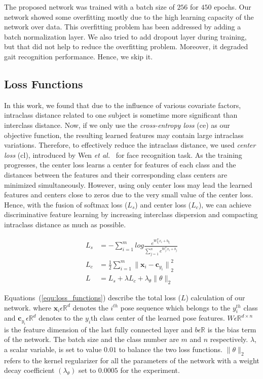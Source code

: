 The proposed network was trained with a batch size of $ 256 $ for $ 450 $ epochs. Our network showed some overfitting mostly due to the high learning capacity of the network over data. This overfitting problem has been addressed by adding a batch normalization layer. We also tried to add dropout layer during training, but that did not help to reduce the overfitting problem. Moreover, it degraded gait recognition performance. Hence, we skip it.


\subsection{Loss Functions}
In this work, we found that due to the influence of various covariate factors, intraclass distance related to one subject is sometime more significant than interclass distance. Now, if we only use the \textit{cross-entropy loss} (\gls{ce}) as our objective function, the resulting learned features may contain large intraclass variations. Therefore, to effectively reduce the intraclass distance, we used \textit{center loss} (\gls{cl}), introduced by Wen \textit{et al.}~\cite{Wen_16} for face recognition task. As the training progresses, the center loss learns a center for features of each class and the distances between the features and their corresponding class centers are minimized simultaneously. However, using only center loss may lead the learned features and centers close to zeros due to the very small value of the center loss. Hence, with the fusion of softmax loss ($L_s$) and center loss ($L_c$), we can achieve discriminative feature learning by increasing interclass dispersion and compacting intraclass distance as much as possible.


\begin{equation} \label{equ:loss_functions}
\begin{split}
L_s &=-\sum_{i=1}^{m}log{\frac{e^{W_{y_i}^{T}x_i + b_{y_i}}}{\sum_{j=1}^{n}{e^{W_{j}^{T}x_i+ b_j}}}} \\
L_c &= \frac{1}{2}\sum_{i=1}^{m}{\parallel{{\boldsymbol x_i}-{\boldsymbol c_{y_i}}}\parallel}_2^2 \\
L &= L_s + \lambda L_c + \lambda_{\theta}\parallel{\theta}\parallel_{2}
\end{split} 
\end{equation}

Equations~(\ref{equ:loss_functions}) describe the total loss ($ L $) calculation of our network. where $\boldsymbol x_{i} \epsilon \mathbb {R}^d$ denotes the $i^{th}$ pose sequence which belongs to the $y_i^{th}$ class and  $\boldsymbol c_{y_i} \epsilon \mathbb {R}^d$ denotes to the $y_i$th class center of the learned pose features. $W \epsilon \mathbb {R}^{d\times n}$ is the feature dimension of the last fully connected layer and $b\epsilon \mathbb {R}$ is the bias term of the network. The batch size and the class number are $ m $ and $ n $ respectively. $\lambda$, a scalar variable, is set to value $ 0.01 $ to balance the two loss functions. $\parallel{\theta}\parallel_{2}$ refers to the kernel regularizer for all the parameters of the network with a weight decay coefficient $(\lambda_{\theta})$ set to $0.0005$ for the experiment.  


